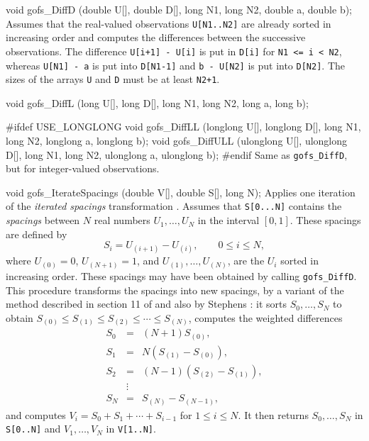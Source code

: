void gofs_DiffD (double U[], double D[], long N1, long N2, 
                 double a, double b);
\endcode
 \tab Assumes that the real-valued observations {\tt U[N1..N2]} 
  are already sorted in increasing order and computes the differences 
  between the successive observations.
  The difference {\tt U[i+1] - U[i]} is put in {\tt D[i]} for 
  {\tt N1 <= i < N2}, whereas {\tt U[N1] - a} is put into {\tt D[N1-1]}
  and {\tt b - U[N2]} is put into {\tt D[N2]}. 
  The sizes of the arrays {\tt U} and {\tt D} must be at least {\tt N2+1}.
 \endtab
\code


void gofs_DiffL (long U[], long D[], long N1, long N2, long a, long b);

#ifdef USE_LONGLONG
void gofs_DiffLL (longlong U[], longlong D[], long N1, long N2,
                  longlong a, longlong b);
void gofs_DiffULL (ulonglong U[], ulonglong D[], long N1, long N2,
                   ulonglong a, ulonglong b);
#endif
\endcode
 \tab Same as {\tt gofs\_DiffD}, but for integer-valued observations.
 \endtab
\code


void gofs_IterateSpacings (double V[], double S[], long N);
\endcode
 \tab Applies one iteration of the {\em iterated spacings\/} 
   transformation \cite{rKNU98a,tSTE86a}.
   Assumes that {\tt S[0...N]} contains the {\em spacings\/} 
   between $N$ real numbers $U_1,\dots,U_N$ in the interval $[0,1]$.
   These spacings are defined by
    $$ S_i = U_{(i+1)} - U_{(i)},  \qquad  0\le i\le N, $$
   where $U_{(0)}=0$, $U_{(N+1)}=1$, and
   $U_{(1)},\dots,U_{(N)}$,  are the $U_i$ sorted in increasing order.
   These spacings may have been obtained by calling {\tt gofs\_DiffD}.
   This procedure transforms the spacings into new
   spacings, by a variant of the  method described
   in section 11 of \cite {rMAR85a} and also by Stephens \cite{tSTE86a}:
   it sorts $S_0,\dots,S_N$ to obtain
   $S_{(0)} \le S_{(1)} \le S_{(2)} \le \cdots \le S_{(N)}$,
   computes the weighted differences
  \begin {eqnarray*}
    S_{0}   &=& (N+1) S_{(0)}, \\
    S_{1}   &=& N (S_{(1)}-S_{(0)}), \\
    S_{2}   &=& (N-1) (S_{(2)}-S_{(1)}),\\
            & \vdots& \\
    S_{N}   &=& S_{(N)}-S_{(N-1)},
  \end {eqnarray*}
   and computes $V_i = S_0 + S_1 + \cdots + S_{i-1}$ for $1\le i\le N$.
   It then returns $S_0,\dots,S_N$ in {\tt S[0..N]} and
   $V_1,\dots,V_N$ in {\tt V[1..N]}.

